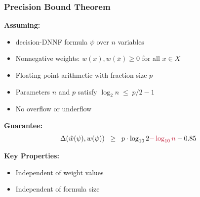 \documentclass[t,pdf]{beamer}
\newcommand{\obar}[1]{\overline{#1}}
\newcommand{\approximate}[1]{\hat{#1}}
\newcommand{\approxw}{\approximate{w}}
\newcommand{\decimalprecision}{\Delta}
\newcommand{\rtext}[1]{\textcolor{xred}{#1}}
\begin{document}
\begin{frame}
  \frametitle{Precision Bound Theorem}

\bigskip

  \textbf{Assuming:}
  \begin{itemize}
  \item decision-DNNF formula $\psi$ over $n$ variables
  \item Nonnegative weights: $w(x), w(\obar{x}) \geq 0$ for all $x \in X$
  \item Floating point arithmetic with fraction size $p$
  \item Parameters $n$ and $p$ satisfy $\log_2 n \;\leq\; p/2-1$
  \item No overflow or underflow
  \end{itemize}

\medskip

\textbf{Guarantee:}
\begin{displaymath}
\decimalprecision(\approxw(\psi), w(\psi)) \;\; \geq \;\; p \cdot \log_{10}2 \rtext{- \log_{10}n} - 0.85
\end{displaymath}

\textbf{Key Properties:}
\begin{itemize}
\item Independent of weight values
\item Independent of formula size
\end{itemize}
\end{frame}
\end{document}
